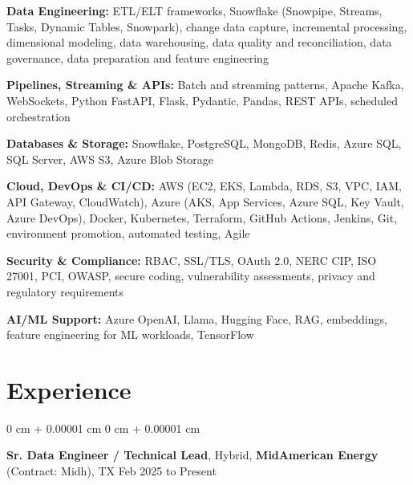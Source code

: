 \documentclass[10pt, letterpaper]{article}
\newenvironment{onecolentry}{
    \begin{adjustwidth}{
        0 cm + 0.00001 cm
    }{
        0 cm + 0.00001 cm
    }
}{
    \end{adjustwidth}
} %
\newcommand{\resumeheading}[2]{%
    \begin{onecolentry}
        #1 \hfill #2
    \end{onecolentry}
} %
\begin{document}
\textbf{Data Engineering:}
ETL/ELT frameworks, Snowflake (Snowpipe, Streams, Tasks, Dynamic Tables, Snowpark), change data capture, incremental processing, dimensional modeling, data warehousing, data quality and reconciliation, data governance, data preparation and feature engineering

\vspace{0.12em}

\textbf{Pipelines, Streaming \& APIs:}
Batch and streaming patterns, Apache Kafka, WebSockets, Python FastAPI, Flask, Pydantic, Pandas, REST APIs, scheduled orchestration

\vspace{0.12em}

\textbf{Databases \& Storage:}
Snowflake, PostgreSQL, MongoDB, Redis, Azure SQL, SQL Server, AWS S3, Azure Blob Storage

\vspace{0.12em}

\textbf{Cloud, DevOps \& CI/CD:}
AWS (EC2, EKS, Lambda, RDS, S3, VPC, IAM, API Gateway, CloudWatch), Azure (AKS, App Services, Azure SQL, Key Vault, Azure DevOps), Docker, Kubernetes, Terraform, GitHub Actions, Jenkins, Git, environment promotion, automated testing, Agile

\vspace{0.12em}

\textbf{Security \& Compliance:}
RBAC, SSL/TLS, OAuth 2.0, NERC CIP, ISO 27001, PCI, OWASP, secure coding, vulnerability assessments, privacy and regulatory requirements

\vspace{0.12em}

\textbf{AI/ML Support:}
Azure OpenAI, Llama, Hugging Face, RAG, embeddings, feature engineering for ML workloads, TensorFlow



\section{Experience}

\resumeheading{\textbf{Sr. Data Engineer / Technical Lead}, Hybrid, \textbf{MidAmerican Energy} (Contract: Midh), TX}{Feb 2025 to Present}
\end{document}
